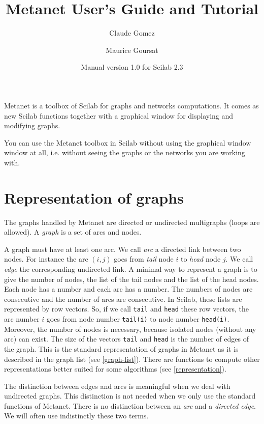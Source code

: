 \documentclass[11pt]{article}
\title{Metanet User's Guide and Tutorial}
\author{Claude Gomez \and Maurice Goursat}
\date{Manual version 1.0 for Scilab 2.3}
\begin{document}
\maketitle

Metanet is a toolbox of Scilab for graphs and networks computations.
It comes as new
Scilab functions together with a graphical
window for displaying and modifying graphs.

You can use the Metanet toolbox in Scilab without using the graphical window
window at all,
\mbox{i.e.} without seeing the graphs or the networks you are working with.

\section{Representation of graphs}

The graphs handled by Metanet are directed or undirected multigraphs 
(loops are allowed).
A \emph{graph}
is a set of arcs and nodes. 

A graph must have at least one arc. 
We call \emph{arc} a directed link between two nodes. 
For instance the arc $(i,j)$ goes from \emph{tail}
node $i$ to \emph{head}
node $j$. 
We call \emph{edge} the 
corresponding undirected link. A minimal way to represent a graph is to
give the number of nodes, the list of the tail nodes and the list of the
head nodes. Each node has a number and each arc has a number. The numbers
of nodes are consecutive and the number of arcs are consecutive. In Scilab,
these lists are represented by row vectors. So, if we call \texttt{tail} and
\texttt{head} these row vectors, the arc number $i$ goes from node
number \texttt{tail(i)} to node number \texttt{head(i)}. Moreover, 
the number of
nodes is necessary, because isolated nodes (without any arc) can exist. The
size of the vectors \texttt{tail} and \texttt{head} is the number of
edges of the graph. This is the standard representation of graphs in
Metanet as it is described in the graph list (see \ref{graph-list}).
There are functions to compute other representations better suited for
some algorithms (see \ref{representation}).

The distinction between edges and arcs is meaningful when
we 
deal with
undirected graphs. This distinction is not needed when we
only use the standard functions of Metanet. There is no distinction
between an \emph{arc} and a \emph{directed edge}. 
We will often use indistinctly
these two terms.
\end{document}
